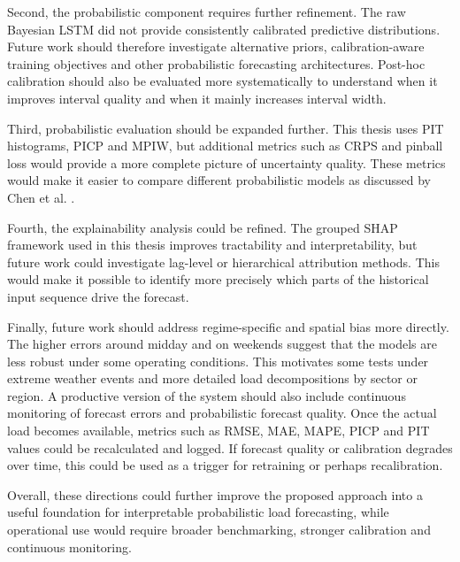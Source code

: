 \documentclass[Master,english,IEEE]{twbook}
\begin{document}
Second, the probabilistic component requires further refinement. The raw Bayesian LSTM did not provide consistently calibrated predictive distributions. Future work should therefore investigate alternative priors, calibration-aware training objectives and other probabilistic forecasting architectures. Post-hoc calibration should also be evaluated more systematically to understand when it improves interval quality and when it mainly increases interval width.

Third, probabilistic evaluation should be expanded further. This thesis uses PIT histograms, PICP and MPIW, but additional metrics such as CRPS and pinball loss would provide a more complete picture of uncertainty quality. These metrics would make it easier to compare different probabilistic models as discussed by Chen et al. \cite{chenEvaluationProbabilisticElectricity2024}.

Fourth, the explainability analysis could be refined. The grouped SHAP framework used in this thesis improves tractability and interpretability, but future work could investigate lag-level or hierarchical attribution methods. This would make it possible to identify more precisely which parts of the historical input sequence drive the forecast.

Finally, future work should address regime-specific and spatial bias more directly. The higher errors around midday and on weekends suggest that the models are less robust under some operating conditions. This motivates some tests under extreme weather events and more detailed load decompositions by sector or region. A productive version of the system should also include continuous monitoring of forecast errors and probabilistic forecast quality. Once the actual load becomes available, metrics such as RMSE, MAE, MAPE, PICP and PIT values could be recalculated and logged. If forecast quality or calibration degrades over time, this could be used as a trigger for retraining or perhaps recalibration.

Overall, these directions could further improve the proposed approach into a useful foundation for interpretable probabilistic load forecasting, while operational use would require broader benchmarking, stronger calibration and continuous monitoring.



%
%
\clearpage
\printbibliography
\clearpage
\end{document}
